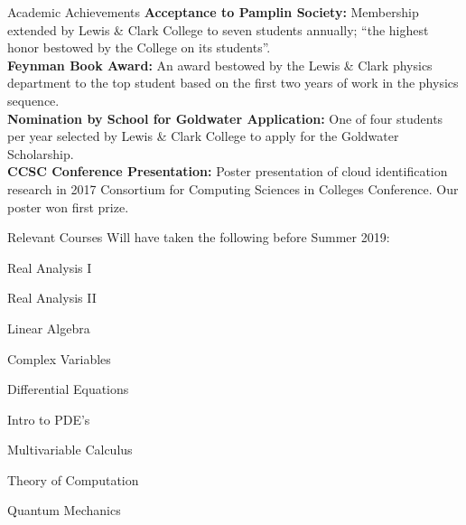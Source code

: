 \documentclass{resume}
\begin{document}
\vspace{-1mm}
\begin{rSection}{Academic Achievements} 
    \textbf{Acceptance to Pamplin Society:} Membership extended by Lewis \&
    Clark College to seven students annually; ``the highest honor bestowed
    by the College on its students''.\\
    \textbf{Feynman Book Award:} An award bestowed by the Lewis \& Clark
    physics department to the top student based on the first two years of
    work in the physics sequence.\\
    \textbf{Nomination by School for Goldwater Application:} One of four
    students per year selected by Lewis \& Clark College to apply for the
    Goldwater Scholarship.\\
    \textbf{CCSC Conference Presentation:} Poster presentation of cloud
    identification research in 2017 Consortium for Computing Sciences
    in Colleges Conference. Our poster won first prize.
\end{rSection}
\vspace{-1mm}
    \begin{rSection}{Relevant Courses}
    Will have taken the following before Summer 2019:
    \vspace{-1.5mm}
    \begin{itemize}
        \begin{minipage}{0.33\linewidth}
            \item Real Analysis I
            \item Real Analysis II
            \item Linear Algebra
        \end{minipage}
        \begin{minipage}{0.33\linewidth}
            \item Complex Variables
            \item Differential Equations 
            \item Intro to PDE's
        \end{minipage}
        \begin{minipage}{0.33\linewidth}
            \item Multivariable Calculus
            \item Theory of Computation
            \item Quantum Mechanics
        \end{minipage}
    \end{itemize}
\end{rSection}
\end{document}
